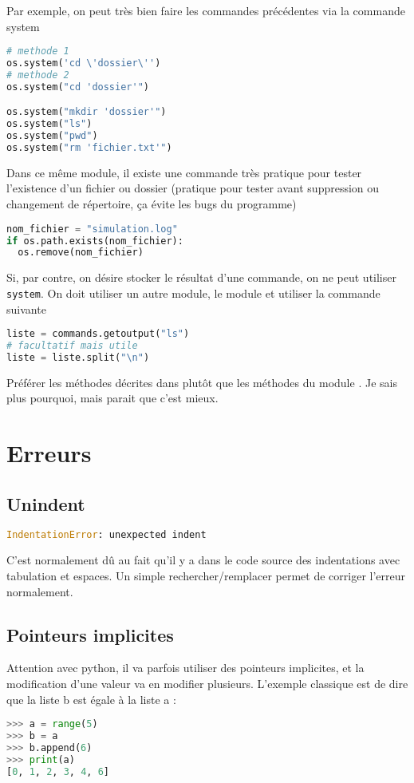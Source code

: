 \documentclass[a4paper,twoside]{article}
\begin{document}
Par exemple, on peut très bien faire les commandes précédentes via la commande system
\begin{lstlisting}[language=python]
# methode 1
os.system('cd \'dossier\'')
# methode 2
os.system("cd 'dossier'")

os.system("mkdir 'dossier'")
os.system("ls")
os.system("pwd")
os.system("rm 'fichier.txt'")
\end{lstlisting}

Dans ce même module, il existe une commande très pratique pour tester l'existence d'un fichier ou dossier (pratique pour tester avant suppression ou changement de répertoire, ça évite les bugs du programme)
\begin{lstlisting}[language=python]
nom_fichier = "simulation.log"
if os.path.exists(nom_fichier):
  os.remove(nom_fichier)
\end{lstlisting}


Si, par contre, on désire stocker le résultat d'une commande, on ne peut utiliser \texttt{system}. On doit utiliser un autre module, le module  et utiliser la commande suivante
\begin{lstlisting}[language=python]
liste = commands.getoutput("ls")
# facultatif mais utile
liste = liste.split("\n")
\end{lstlisting}

\begin{attention}
Préférer les méthodes décrites dans  plutôt que les méthodes du module . Je sais plus pourquoi, mais parait que c'est mieux.
\end{attention}

\section{Erreurs}
\subsection{Unindent}
\begin{lstlisting}[language=python]
IndentationError: unexpected indent
\end{lstlisting}

C'est normalement dû au fait qu'il y a dans le code source des indentations avec tabulation et espaces. Un simple rechercher/remplacer permet de corriger l'erreur normalement.

\subsection{Pointeurs implicites}
Attention avec python, il va parfois utiliser des pointeurs implicites, et la modification d'une valeur va en modifier plusieurs. L'exemple classique est de dire que la liste b est égale à la liste a :
\begin{lstlisting}[language=python]
>>> a = range(5)
>>> b = a
>>> b.append(6)
>>> print(a)
[0, 1, 2, 3, 4, 6]
\end{lstlisting}
\end{document}
